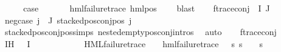 \begin{isabellebody}
\ \ \isamarkupfalse%
\ \isamarkupfalse%
\ {\isacharquery}{\kern0pt}case\ \isanewline
\ \ \ \ \isamarkupfalse%
\ {\isacartoucheopen}hml{\isacharunderscore}{\kern0pt}failure{\isacharunderscore}{\kern0pt}trace\ {\isacharparenleft}{\kern0pt}hml{\isacharunderscore}{\kern0pt}pos\ {\isasymalpha}\ {\isasympsi}{\isacharparenright}{\kern0pt}{\isacartoucheclose}\ \isamarkupfalse%
\ blast\isanewline
{}\isamarkupfalse%
\isanewline
\ \ \isamarkupfalse%
\ {\isacharparenleft}{\kern0pt}f{\isacharunderscore}{\kern0pt}trace{\isacharunderscore}{\kern0pt}conj\ {\isasymPhi}\ I\ J{\isacharparenright}{\kern0pt}\isanewline
\ \ \isamarkupfalse%
\ neg{\isacharunderscore}{\kern0pt}case{\isacharcolon}{\kern0pt}\ {\isachardoublequoteopen}{\isasymforall}j{\isasymin}{\isasymPhi}\ {\isacharbackquote}{\kern0pt}\ J{\isachardot}{\kern0pt}\ stacked{\isacharunderscore}{\kern0pt}pos{\isacharunderscore}{\kern0pt}conj{\isacharunderscore}{\kern0pt}pos\ j{\isachardoublequoteclose}\ \isanewline
\ \ \ \ \isamarkupfalse%
\ stacked{\isacharunderscore}{\kern0pt}pos{\isacharunderscore}{\kern0pt}conj{\isacharunderscore}{\kern0pt}pos{\isachardot}{\kern0pt}simps\ nested{\isacharunderscore}{\kern0pt}empty{\isacharunderscore}{\kern0pt}pos{\isacharunderscore}{\kern0pt}conj{\isachardot}{\kern0pt}intros{\isacharparenleft}{\kern0pt}{}{\isacharparenright}{\kern0pt}\ \isamarkupfalse%
\ auto\isanewline
\ \ \isamarkupfalse%
\ f{\isacharunderscore}{\kern0pt}trace{\isacharunderscore}{\kern0pt}conj\ \isamarkupfalse%
\ IH{\isacharcolon}{\kern0pt}\ {\isachardoublequoteopen}{\isacharparenleft}{\kern0pt}{\isacharparenleft}{\kern0pt}{\isasymexists}{\isasympsi}{\isasymin}{\isasymPhi}\ {\isacharbackquote}{\kern0pt}\ I{\isachardot}{\kern0pt}\isanewline
\ \ \ \ \ \ \ \ \ \ \ \ {\isacharparenleft}{\kern0pt}HML{\isacharunderscore}{\kern0pt}failure{\isacharunderscore}{\kern0pt}trace\ {\isasympsi}\ {\isasymand}\ {\isacharparenleft}{\kern0pt}{\isasymexists}{\isasympsi}{\isacharprime}{\kern0pt}{\isachardot}{\kern0pt}\ hml{\isacharunderscore}{\kern0pt}failure{\isacharunderscore}{\kern0pt}trace\ {\isasympsi}{\isacharprime}{\kern0pt}\ {\isasymand}\ {\isacharparenleft}{\kern0pt}{\isasymforall}s{\isachardot}{\kern0pt}\ {\isacharparenleft}{\kern0pt}s\ {\isasymTurnstile}\ {\isasympsi}{\isacharparenright}{\kern0pt}\ {\isacharequal}{\kern0pt}\ {\isacharparenleft}{\kern0pt}s\ {\isasymTurnstile}\ {\isasympsi}{\isacharprime}{\kern0pt}{\isacharparenright}{\kern0pt}{\isacharparenright}{\kern0pt}{\isacharparenright}{\kern0pt}{\isacharparenright}{\kern0pt}\ {\isasymand}\isanewline

\end{isabellebody}
